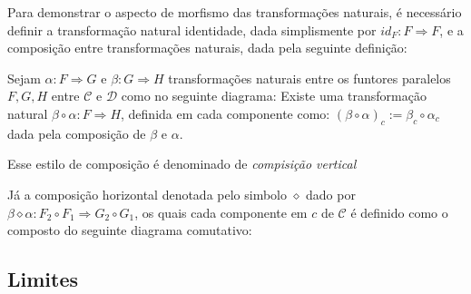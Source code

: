 \documentclass[../main.tex]{subfiles}
\begin{document}
Para demonstrar o aspecto de morfismo das transformações naturais, é necessário definir a transformação natural identidade, dada simplismente por $id_F : F \Rightarrow F$, e a composição entre transformações naturais, dada pela seguinte definição:

\begin{definition}
    Sejam $\alpha : F \Rightarrow G$ e $\beta : G \Rightarrow H$ transformações naturais entre os funtores paralelos $F, G, H$ entre $\mathcal{C}$ e $\mathcal{D}$ como no seguinte diagrama:
    Existe uma transformação natural $\beta \circ \alpha : F \Rightarrow H$, definida em cada componente como: $(\beta \circ \alpha)_c := \beta_c \circ \alpha_c$ dada pela composição de $\beta$ e $\alpha$.
\end{definition}

Esse estilo de composição é denominado de \emph{compisição vertical}

Já a composição horizontal denotada pelo simbolo $\diamond$ dado por $\beta \diamond \alpha : F_2 \circ F_1 \Rightarrow G_2 \circ G_1$, os quais cada componente em $c$ de $\mathcal{C}$ é definido como o composto do seguinte diagrama comutativo:


\subsection{Limites}
\end{document}
